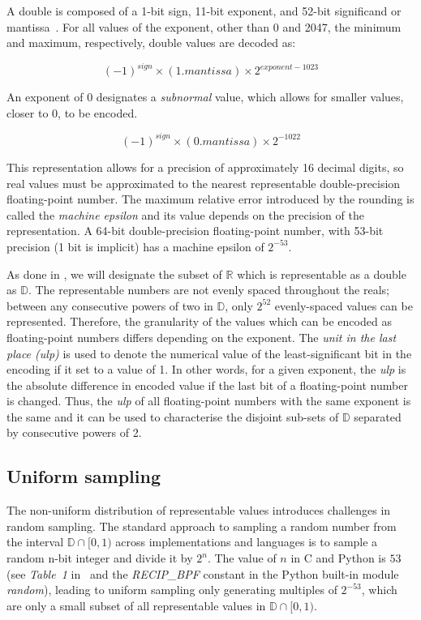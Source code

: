 \documentclass[orivec,envcountsame]{llncs}
\begin{document}
A double is composed of a 1-bit sign, 11-bit exponent, and 52-bit significand or mantissa~\cite{IEEE}. For all values of the exponent, other than 0 and 2047, the minimum and maximum, respectively, double values are decoded as:

$$ (-1)^{sign} \times (1.mantissa) \times 2^{exponent-1023} $$

An exponent of 0 designates a \textit{subnormal} value, which allows for smaller values, closer to 0, to be encoded.

$$ (-1)^{sign} \times (0.mantissa) \times 2^{-1022} $$

This representation allows for a precision of approximately 16 decimal digits, so real values must be approximated to the nearest representable double-precision floating-point number. The maximum relative error introduced by the rounding is called the \textit{machine epsilon} and its value depends on the precision of the representation. A 64-bit double-precision floating-point number, with 53-bit precision (1 bit is implicit) has a machine epsilon of $2^{-53}$.

As done in \cite{mironov2012significance}, we will designate the subset of $\mathbb{R}$ which is representable as a double as $\mathbb{D}$. The representable numbers are not evenly spaced throughout the reals; between any consecutive powers of two in $\mathbb{D}$, only $2^{52}$ evenly-spaced values can be represented. Therefore, the granularity of the values which can be encoded as floating-point numbers differs depending on the exponent. The \textit{unit in the last place (ulp)} is used to denote the numerical value of the least-significant bit in the encoding if it set to a value of 1. In other words, for a given exponent, the \textit{ulp} is the absolute difference in encoded value if the last bit of a floating-point number is changed. Thus, the \textit{ulp} of all floating-point numbers with the same exponent is the same and it can be used to characterise the disjoint sub-sets of $\mathbb{D}$ separated by consecutive powers of 2.

\subsection{Uniform sampling}
The non-uniform distribution of representable values introduces challenges in random sampling. The standard approach to sampling a random number from the interval $\mathbb{D} \cap [0, 1)$ across implementations and languages is to sample a random n-bit integer and divide it by $2^n$. The value of $n$ in C and Python is $53$ (see \textit{Table~1} in~\cite{mironov2012significance} and the \textit{RECIP\_BPF} constant in the Python built-in module \textit{random}), leading to uniform sampling only generating multiples of $2^{-53}$, which are only a small subset of all representable values in $\mathbb{D} \cap [0, 1)$.
\end{document}

